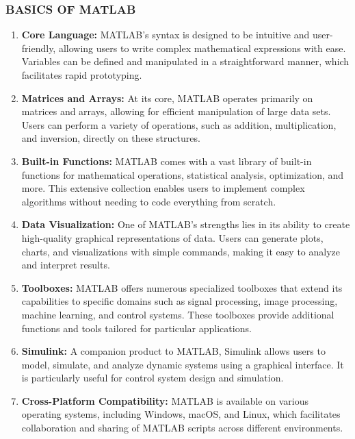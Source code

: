 \documentclass[12pt,a4paper]{article}
\begin{document}
\subsubsection*{BASICS OF MATLAB}
\begin{enumerate}
    \item \textbf{Core Language:} MATLAB's syntax is designed to be intuitive and user-friendly, allowing users to write complex mathematical expressions with ease. Variables can be defined and manipulated in a straightforward manner, which facilitates rapid prototyping.

    \item \textbf{Matrices and Arrays:} At its core, MATLAB operates primarily on matrices and arrays, allowing for efficient manipulation of large data sets. Users can perform a variety of operations, such as addition, multiplication, and inversion, directly on these structures.

    \item \textbf{Built-in Functions:} MATLAB comes with a vast library of built-in functions for mathematical operations, statistical analysis, optimization, and more. This extensive collection enables users to implement complex algorithms without needing to code everything from scratch.

    \item \textbf{Data Visualization:} One of MATLAB's strengths lies in its ability to create high-quality graphical representations of data. Users can generate plots, charts, and visualizations with simple commands, making it easy to analyze and interpret results.

    \item \textbf{Toolboxes:} MATLAB offers numerous specialized toolboxes that extend its capabilities to specific domains such as signal processing, image processing, machine learning, and control systems. These toolboxes provide additional functions and tools tailored for particular applications.

    \item \textbf{Simulink:} A companion product to MATLAB, Simulink allows users to model, simulate, and analyze dynamic systems using a graphical interface. It is particularly useful for control system design and simulation.

    \item \textbf{Cross-Platform Compatibility:} MATLAB is available on various operating systems, including Windows, macOS, and Linux, which facilitates collaboration and sharing of MATLAB scripts across different environments. 
\end{enumerate}
\end{document}
